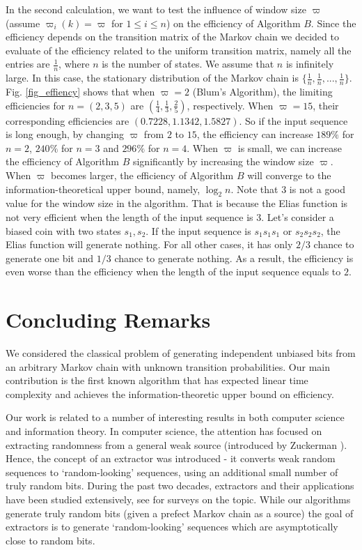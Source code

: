 \documentclass[journal]{IEEEtran}
\begin{document}
In the second calculation, we want to test the influence of window size $\varpi$ (assume $\varpi_i(k)=\varpi$ for $1\leq i\leq n$) on the efficiency of Algorithm $B$. Since the efficiency depends on the transition matrix of the Markov chain we decided to evaluate of the efficiency related to the uniform transition matrix, namely all the entries are  $\frac{1}{n}$, where $n$ is the number of states. We assume that $n$ is infinitely large. In this case, the stationary distribution of
the Markov chain is $\{\frac{1}{n},\frac{1}{n},...,\frac{1}{n}\}$.  Fig. \ref{fig_effiency} shows that when $\varpi=2$ (Blum's Algorithm), the limiting efficiencies for $n=(2,3,5)$ are $(\frac{1}{4},\frac{1}{3},\frac{2}{5})$, respectively. When $\varpi=15$, their corresponding efficiencies are
$(0.7228, 1.1342, 1.5827)$. So if the input sequence is long enough, by changing $\varpi$ from $2$ to $15$, the efficiency can increase
$189\%$ for $n=2$, $240\%$ for $n=3$ and $296\%$ for $n=4$. When $\varpi$ is small, we can increase the efficiency of Algorithm $B$ significantly  by increasing the window size $\varpi$.
When $\varpi$ becomes larger, the efficiency of Algorithm $B$ will converge to the information-theoretical upper bound, namely, $\log_2 n$. Note that $3$ is not a good value for the window size in the algorithm. That is because the Elias function is not very efficient
when the length of the input sequence is $3$. Let's consider a biased coin with two states $s_1, s_2$. If the
input sequence is $s_1s_1s_1$ or $s_2s_2s_2$, the Elias function will generate nothing. For all other
cases, it has only $2/3$ chance to generate one bit and $1/3$ chance to generate nothing. As a result,
the efficiency is even worse than the efficiency when the length of the input sequence equals to $2$.

\section{Concluding Remarks}

We considered the classical problem of generating independent unbiased bits from an arbitrary Markov chain with unknown transition probabilities. Our main contribution is the first known algorithm that has expected linear time complexity and achieves the information-theoretic upper bound on efficiency.

Our work is related to a number of interesting results in both computer science and information theory. In computer science, the attention has focused on extracting randomness from a general weak source (introduced by Zuckerman \cite{Zuc90}). Hence, the concept of an extractor was introduced - it converts weak random sequences to `random-looking' sequences, using an additional small number of truly random bits. During the past two decades, extractors and their applications have been studied extensively, see \cite{Nis96}\cite{Sha02} for surveys on the topic.  While our algorithms generate truly random bits (given a prefect Markov chain as a source) the goal of extractors is to generate `random-looking' sequences which are asymptotically close to random bits.
\end{document}
